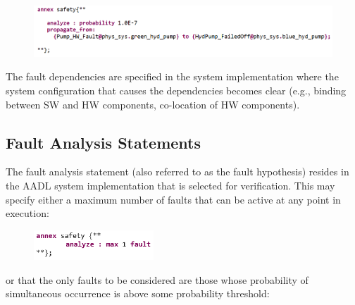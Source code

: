 \begin{figure}[h!]
	\vspace{-0.1in}
	\begin{center}
		\includegraphics[width=1.0\textwidth]{images/hw_prop_stmt.png}
	\end{center}
	\vspace{-0.3in}
	\label{fig:hwFaultProp}
\end{figure}

The fault dependencies are specified in the system implementation where the system configuration that causes the dependencies becomes clear (e.g., binding between SW and HW components, co-location of HW components). 



\subsection{Fault Analysis Statements}
The fault analysis statement (also referred to as the fault hypothesis) resides in the AADL system implementation that is selected for verification. This may specify either a maximum number of faults that can be active at any point in execution:

\begin{figure}[h!]
	\vspace{-0.1in}
		\includegraphics[width=0.4\textwidth]{images/hypothesisMaxN.png}
	\vspace{-0.1in}
	\label{fig:hypothesisMaxN}
\end{figure}
or that the only faults to be considered are those whose probability of simultaneous occurrence is above some probability threshold: 

